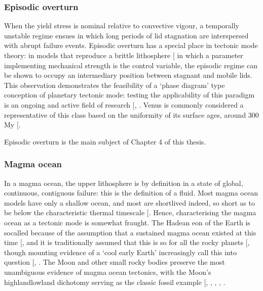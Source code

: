 \documentclass[letterpaper,10pt,english]{jupyterBook}
\begin{document}
\subsubsection{Episodic overturn}
\label{\detokenize{content/chapter_01_background/main:episodic-overturn}}
\sphinxAtStartPar
When the yield stress is nominal relative to convective vigour, a temporally unstable regime ensues in which long periods of lid stagnation are interspersed with abrupt failure events. Episodic overturn has a special place in tectonic mode theory: in models that reproduce a brittle lithosphere {[}\sphinxcite{references:id759}{]} in which a parameter implementing mechanical strength is the control variable, the episodic regime can be shown to occupy an intermediary position between stagnant and mobile lids. This observation demonstrates the feasibility of a ‘phase diagram’ type conception of planetary tectonic mode: testing the applicability of this paradigm is an ongoing and active field of research {[}, \sphinxcite{references:id513}{]}. Venus is commonly considered a representative of this class based on the uniformity of its surface ages, around 300 My {[}\sphinxcite{references:id639}{]}.

\sphinxAtStartPar
Episodic overturn is the main subject of Chapter 4 of this thesis.


\subsubsection{Magma ocean}
\label{\detokenize{content/chapter_01_background/main:magma-ocean}}
\sphinxAtStartPar
In a magma ocean, the upper lithosphere is by definition in a state of global, continuous, contiguous failure: this is the definition of a fluid. Most magma ocean models have only a shallow ocean, and most are short\sphinxhyphen{}lived \sphinxhyphen{} indeed, so short as to be below the characteristic thermal timescale {[}\sphinxcite{references:id334}{]}. Hence, characterising the magma ocean as a tectonic mode is somewhat fraught. The Hadean eon of the Earth is so\sphinxhyphen{}called because of the assumption that a sustained magma ocean existed at this time {[}\sphinxcite{references:id696}{]}, and it is traditionally assumed that this is so for all the rocky planets {[}\sphinxcite{references:id354}{]}, though mounting evidence of a ‘cool early Earth’ increasingly call this into question {[}, \sphinxcite{references:id245}{]}. The Moon and other small rocky bodies preserve the most unambiguous evidence of magma ocean tectonics, with the Moon’s highland\sphinxhyphen{}lowland dichotomy serving as the classic fossil example {[}, , , , \sphinxcite{references:id240}{]}.
\end{document}
